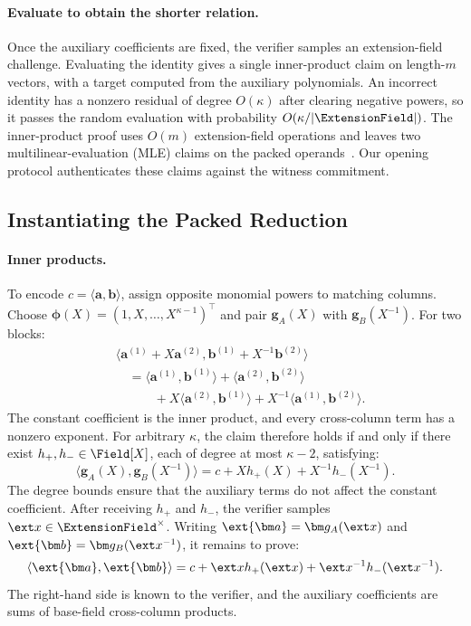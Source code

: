 \paragraph{Evaluate to obtain the shorter relation.}
Once the auxiliary coefficients are fixed, the verifier samples an
extension-field challenge. Evaluating the identity gives a single
inner-product claim on length-\(m\) vectors, with a target computed
from the auxiliary polynomials.
An incorrect identity has a nonzero residual of degree \(O(\kappa)\)
after clearing negative powers, so it passes the random evaluation
with probability \(O(\kappa/|\ExtensionField|)\).
The inner-product proof uses \(O(m)\) extension-field operations
and leaves two multilinear-evaluation (MLE) claims on the packed
operands~\cite{asiacrypt/CCYY25}. Our opening protocol authenticates
these claims against the witness commitment.

\subsection{Instantiating the Packed Reduction}

\paragraph{Inner products.}
To encode \(c=\langle\bm a,\bm b\rangle\), assign opposite monomial
powers to matching columns. Choose
\(\bm\phi(X)=(1,X,\ldots,X^{\kappa-1})^\top\) and pair
\(\bm g_A(X)\) with \(\bm g_B(X^{-1})\).
For two blocks:
\[
\begin{aligned}
 &\langle\bm a^{(1)}+X\bm a^{(2)},
          \bm b^{(1)}+X^{-1}\bm b^{(2)}\rangle\\
 &\quad=
   \langle\bm a^{(1)},\bm b^{(1)}\rangle
   +\langle\bm a^{(2)},\bm b^{(2)}\rangle\\
 &\qquad\quad
   +X\langle\bm a^{(2)},\bm b^{(1)}\rangle
   +X^{-1}\langle\bm a^{(1)},\bm b^{(2)}\rangle.
\end{aligned}
\]
The constant coefficient is the inner product, and every
cross-column term has a nonzero exponent.
For arbitrary \(\kappa\), the claim therefore holds if and only if
there exist
\(h_+,h_-\in\Field[X]\), each of degree at most \(\kappa-2\), satisfying:
\begin{equation*}
    \langle\bm g_A(X),\bm g_B(X^{-1})\rangle
    =c+Xh_+(X)+X^{-1}h_-(X^{-1}).
\end{equation*}
The degree bounds ensure that the auxiliary terms do not affect
the constant coefficient. After receiving \(h_+\) and \(h_-\),
the verifier samples
\(\ext x\in\ExtensionField^\times\).
Writing \(\ext{\bm a}=\bm g_A(\ext x)\) and
\(\ext{\bm b}=\bm g_B(\ext x^{-1})\), it remains to prove:
\[
    \langle\ext{\bm a},\ext{\bm b}\rangle
    =c+\ext xh_+(\ext x)+\ext x^{-1}h_-(\ext x^{-1}).
\]
The right-hand side is known to the verifier, and the auxiliary
coefficients are sums of base-field cross-column products.

